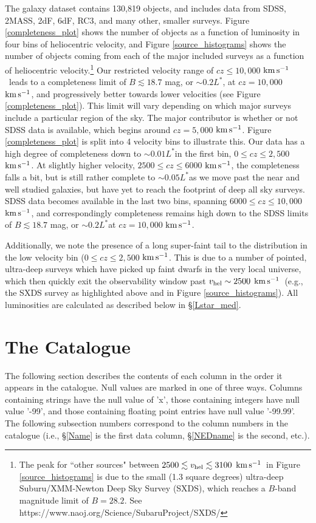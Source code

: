 \documentclass[twocolumn,tighten]{aastex62}
\newcommand{\Lstar}{$L^*$}
\newcommand{\kms}{$\rm km\, s^{-1}$}
\begin{document}
The galaxy dataset contains 130,819 objects, and includes data from SDSS, 2MASS, 2dF, 6dF, RC3, and many other, smaller surveys. Figure \ref{completeness_plot} shows the number of objects as a function of luminosity in four bins of heliocentric velocity, and Figure \ref{source_histograms} shows the number of objects coming from each of the major included surveys as a function of heliocentric velocity.\footnote{The peak for ``other sources" between $2500 \lesssim v_{\rm hel} \lesssim 3100$ \kms~in Figure \ref{source_histograms} is due to the small (1.3 square degrees) ultra-deep Suburu/XMM-Newton Deep Sky Survey (SXDS), which reaches a $B$-band magnitude limit of $B=28.2$. See https://www.naoj.org/Science/SubaruProject/SXDS/} Our restricted velocity range of $cz \leq 10,000$ \kms~leads to a completeness limit of $B \lesssim 18.7$ mag, or $\sim0.2$\Lstar, at $cz = 10,000$ \kms, and progressively better towards lower velocities (see Figure \ref{completeness_plot}). This limit will vary depending on which major surveys include a particular region of the sky. The major contributor is whether or not SDSS data is available, which begins around $cz = 5,000$ \kms. Figure \ref{completeness_plot} is split into 4 velocity bins to illustrate this. Our data has a high degree of completeness down to $\sim0.01$\Lstar in the first bin, $0 \leq cz \leq 2,500$ \kms. At slightly higher velocity, $2500 \leq cz \leq 6000$ \kms, the completeness falls a bit, but is still rather complete to $\sim0.05$\Lstar as we move past the near and well studied galaxies, but have yet to reach the footprint of deep all sky surveys. SDSS data becomes available in the last two bins, spanning $6000 \leq cz \leq 10,000$ \kms, and correspondingly completeness remains high down to the SDSS limits of $B \lesssim 18.7$ mag, or $\sim0.2$\Lstar at $cz = 10,000$ \kms. 


Additionally, we note the presence of a long super-faint tail to the distribution in the low velocity bin ($0 \leq cz \leq 2,500$ \kms. This is due to a number of pointed, ultra-deep surveys which have picked up faint dwarfs in the very local universe, which then quickly exit the observability window past $v_{\rm hel} \sim 2500$ \kms~(e.g., the SXDS survey as highlighted above and in Figure \ref{source_histograms}). All luminosities are calculated as described below in \S \ref{Lstar_med}.


\section{The Catalogue}
The following section describes the contents of each column in the order it appears in the catalogue. Null values are marked in one of three ways. Columns containing strings have the null value of 'x', those containing integers have null value '-99', and those containing floating point entries have null value '-99.99'. The following subsection numbers correspond to the column numbers in the catalogue (i.e., \S \ref{Name} is the first data column, \S \ref{NEDname} is the second, etc.).
\end{document}
